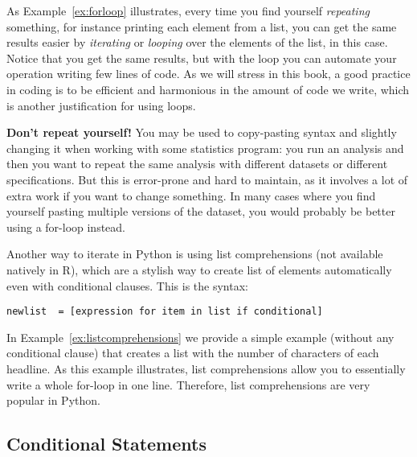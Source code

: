 

As Example~\ref{ex:forloop} illustrates, every time you find yourself
\emph{repeating} something, for instance printing each element from a
list, you can get the same results easier by \emph{iterating} or
\emph{looping} over the elements of the list, in this case.  Notice
that you get the same results, but with the loop you can automate your
operation writing few lines of code. As we will stress in this
book, a good practice in coding is to be efficient and harmonious in
the amount of code we write, which is another justification for using
loops.


\begin{feature}
  \textbf{Don't repeat yourself!}
  You may be used to copy-pasting
  syntax and slightly changing it when working with some statistics
  program: you run an analysis and then you want to repeat the same
  analysis with different datasets or different specifications. But
  this is error-prone and hard to maintain, as it involves a lot of
  extra work if you want to change something. In many cases where you
  find yourself pasting multiple versions of the dataset, you would
  probably be better using a for-loop instead.
  \end{feature}


Another way to iterate in Python is using list comprehensions  (not available natively in R), which are a stylish way to create list of elements automatically even with conditional clauses. This is the syntax:

\begin{verbatim}
newlist  = [expression for item in list if conditional]
\end{verbatim}

In Example~\ref{ex:listcomprehensions} we provide a simple example (without any
conditional clause) that creates a list with the number of characters
of each headline. As this example illustrates, list comprehensions
allow you to essentially write a whole for-loop in one
line. Therefore, list comprehensions are very popular in Python.




\subsection{Conditional Statements}\label{sec:ifelse}

